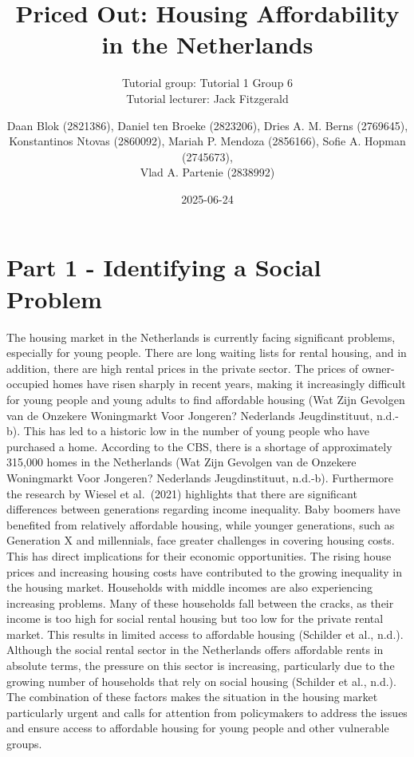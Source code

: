 \documentclass[
]{article}
\title{Priced Out: Housing Affordability in the Netherlands}
\subtitle{Tutorial group: Tutorial 1 Group 6\\
Tutorial lecturer: Jack Fitzgerald}
\author{Daan Blok (2821386), Daniel ten Broeke (2823206), Dries A. M.
Berns (2769645),\\
Konstantinos Ntovas (2860092), Mariah P. Mendoza (2856166), Sofie A.
Hopman (2745673),\\
Vlad A. Partenie (2838992)}
\date{2025-06-24}
\begin{document}
\maketitle

\section{Part 1 - Identifying a Social
Problem}\label{part-1---identifying-a-social-problem}

The housing market in the Netherlands is currently facing significant
problems, especially for young people. There are long waiting lists for
rental housing, and in addition, there are high rental prices in the
private sector. The prices of owner-occupied homes have risen sharply in
recent years, making it increasingly difficult for young people and
young adults to find affordable housing (Wat Zijn Gevolgen van de
Onzekere Woningmarkt Voor Jongeren? \textbar{} Nederlands
Jeugdinstituut, n.d.-b). This has led to a historic low in the number of
young people who have purchased a home. According to the CBS, there is a
shortage of approximately 315,000 homes in the Netherlands (Wat Zijn
Gevolgen van de Onzekere Woningmarkt Voor Jongeren? \textbar{}
Nederlands Jeugdinstituut, n.d.-b). Furthermore the research by Wiesel
et al.~(2021) highlights that there are significant differences between
generations regarding income inequality. Baby boomers have benefited
from relatively affordable housing, while younger generations, such as
Generation X and millennials, face greater challenges in covering
housing costs. This has direct implications for their economic
opportunities. The rising house prices and increasing housing costs have
contributed to the growing inequality in the housing market. Households
with middle incomes are also experiencing increasing problems. Many of
these households fall between the cracks, as their income is too high
for social rental housing but too low for the private rental market.
This results in limited access to affordable housing (Schilder et al.,
n.d.). Although the social rental sector in the Netherlands offers
affordable rents in absolute terms, the pressure on this sector is
increasing, particularly due to the growing number of households that
rely on social housing (Schilder et al., n.d.). The combination of these
factors makes the situation in the housing market particularly urgent
and calls for attention from policymakers to address the issues and
ensure access to affordable housing for young people and other
vulnerable groups.
\end{document}
